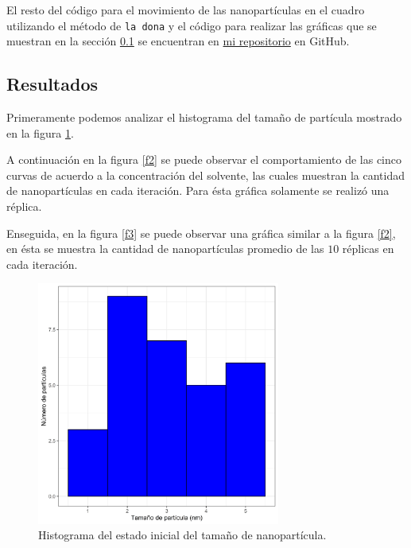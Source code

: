 \documentclass[3p,times,twocolumn]{elsarticle}
\begin{document}
El resto del código para el movimiento de las nanopartículas en el cuadro utilizando el método de \texttt{la dona} y el código para realizar las gráficas que se muestran en la sección \ref{res} se encuentran en \href{https://github.com/nataliaperez0/Simulation/tree/main/Proyectointegrador}{mi repositorio} en GitHub.

\subsection{Resultados}\label{res}

Primeramente podemos analizar el histograma del tamaño de partícula mostrado en la figura \ref{f1}. 

A continuación en la figura \ref{f2} se puede observar el comportamiento de las cinco curvas de acuerdo a la concentración del solvente, las cuales muestran la cantidad de nanopartículas en cada iteración. Para ésta gráfica solamente se realizó una réplica. 

Enseguida, en la figura \ref{f3} se puede observar una gráfica similar a la figura \ref{f2}, en ésta se muestra la cantidad de nanopartículas promedio de las $10$ réplicas en cada iteración. 

\begin{figure} [h!]%
    \centering
    \includegraphics[width=80mm]{Figura_1.png} %
    \caption{Histograma del estado inicial del tamaño de nanopartícula.}
    \label{f1}
\end{figure} 
\end{document}
